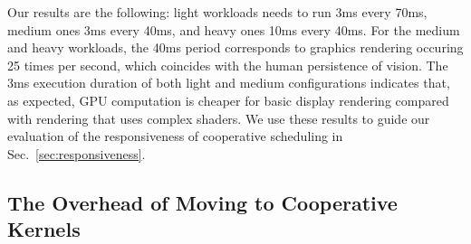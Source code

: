 \documentclass[numbers,nocopyrightspace,10pt]{sigplanconf}
\newcommand{\mytablong}{Table~}
\newcommand{\mysec}{Sec.~}
\begin{document}

Our results are the following: light workloads needs to run 3ms every
70ms, medium ones 3ms every 40ms, and heavy ones 10ms every 40ms. For
the medium and heavy workloads, the 40ms period corresponds to graphics
rendering occuring 25 times per second, which coincides with the human
persistence of vision. The 3ms execution duration of both light and
medium configurations indicates that, as expected, GPU computation is
cheaper for basic display rendering compared with rendering that uses
complex shaders. We use these results to guide our evaluation of the
responsiveness of cooperative scheduling in
\mysec\ref{sec:responsiveness}.



\subsection{The Overhead of Moving to Cooperative Kernels}\label{sec:overhead}

\end{document}
